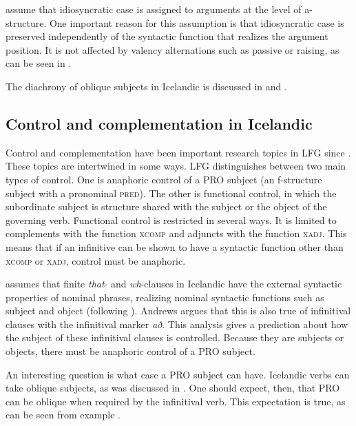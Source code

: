 \documentclass[output=paper,hidelinks]{langscibook}
\begin{document}
 \citet{ZMT85:Case} assume that idiosyncratic case is assigned to arguments at the level of a-structure. One important reason for this assumption is that idiosyncratic case is preserved independently of the syntactic function that realizes the argument position. It is not affected by valency alternations such as passive or raising, as can be seen in .

 The diachrony of oblique subjects in Icelandic is discussed in \citet{SBK15} and \citet{Booth17}.

\subsection{Control and complementation in Icelandic}
\label{sec:Scandinavian:3.2}

Control and complementation have been important research topics in LFG since \citet{bresnan1982control-complementation}. These topics are intertwined in some ways. LFG distinguishes between two main types of control. One is anaphoric control of a PRO subject (an f-structure subject with a pronominal \textsc{pred}). The other is functional control, in which the subordinate subject is structure shared with the subject or the object of the governing verb. Functional control is restricted in several ways. It is limited to complements with the function \textsc{xcomp} and adjuncts with the function \textsc{xadj}. This means that if an infinitive can be shown to have a syntactic function other than \textsc{xcomp} or \textsc{xadj}, control must be anaphoric.

 \citet{Andrews82} assumes that finite \textit{that}{}- and \textit{wh}{}-clauses in Icelandic have the external syntactic properties of nominal phrases, realizing nominal syntactic functions such as subject and object (following \citealt{Thrainsson79}). Andrews argues that this is also true of infinitival clauses with the infinitival marker \textit{að}. This analysis gives a prediction about how the subject of these infinitival clauses is controlled. Because they are subjects or objects, there must be anaphoric control of a PRO subject.

 An interesting question is what case a PRO subject can have. Icelandic verbs can take oblique subjects, as was discussed in . One should expect, then, that PRO can be oblique when required by the infinitival verb. This expectation is true, as can be seen from example .
\end{document}
